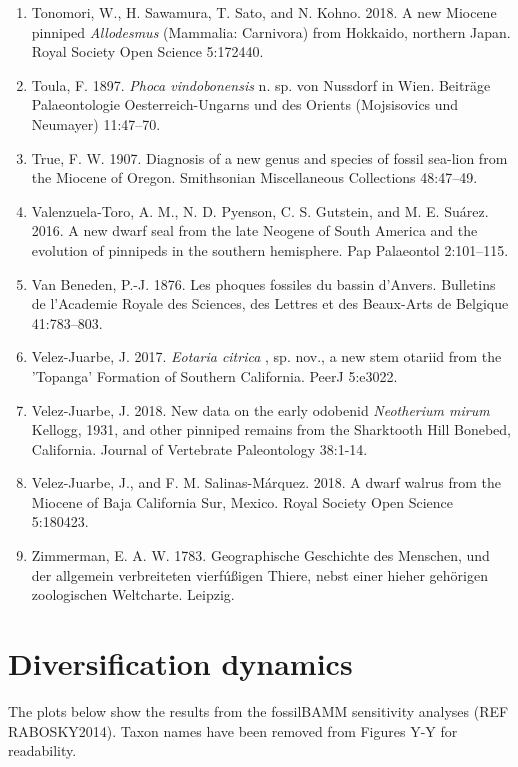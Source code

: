 \documentclass[a4paper, 12pt]{article}
\begin{document}
\begin{enumerate}
\item Tonomori, W., H. Sawamura, T. Sato, and N. Kohno. 2018. A new Miocene pinniped \textit{Allodesmus} (Mammalia: Carnivora) from Hokkaido, northern Japan. Royal Society Open Science 5:172440.
\item Toula, F. 1897. \textit{Phoca vindobonensis} n. sp. von Nussdorf in Wien. Beiträge Palaeontologie Oesterreich-Ungarns und des Orients (Mojsisovics und Neumayer) 11:47–70.
\item True, F. W. 1907. Diagnosis of a new genus and species of fossil sea-lion from the Miocene of Oregon. Smithsonian Miscellaneous Collections 48:47–49.
\item Valenzuela-Toro, A. M., N. D. Pyenson, C. S. Gutstein, and M. E. Suárez. 2016. A new dwarf seal from the late Neogene of South America and the evolution of pinnipeds in the southern hemisphere. Pap Palaeontol 2:101–115.
\item Van Beneden, P.-J. 1876. Les phoques fossiles du bassin d'Anvers. Bulletins de l'Academie Royale des Sciences, des Lettres et des Beaux-Arts de Belgique 41:783–803.
\item Velez-Juarbe, J. 2017. \textit{Eotaria citrica} , sp. nov., a new stem otariid from the 'Topanga' Formation of Southern California. PeerJ 5:e3022.
\item Velez-Juarbe, J. 2018. New data on the early odobenid \textit{Neotherium mirum} Kellogg, 1931, and other pinniped remains from the Sharktooth Hill Bonebed, California. Journal of Vertebrate Paleontology 38:1-14.
\item Velez-Juarbe, J., and F. M. Salinas-M\'{a}rquez. 2018. A dwarf walrus from the Miocene of Baja California Sur, Mexico. Royal Society Open Science 5:180423.
\item Zimmerman, E. A. W. 1783. Geographische Geschichte des Menschen, und der allgemein verbreiteten vierf\'{u}{\ss}igen Thiere, nebst einer hieher geh\"{o}rigen zoologischen Weltcharte. Leipzig.
\end{enumerate}

\newpage
\section{Diversification dynamics}

The plots below show the results from the fossilBAMM sensitivity analyses (REF RABOSKY2014). 
Taxon names have been removed from Figures Y-Y for readability.
\end{document}
